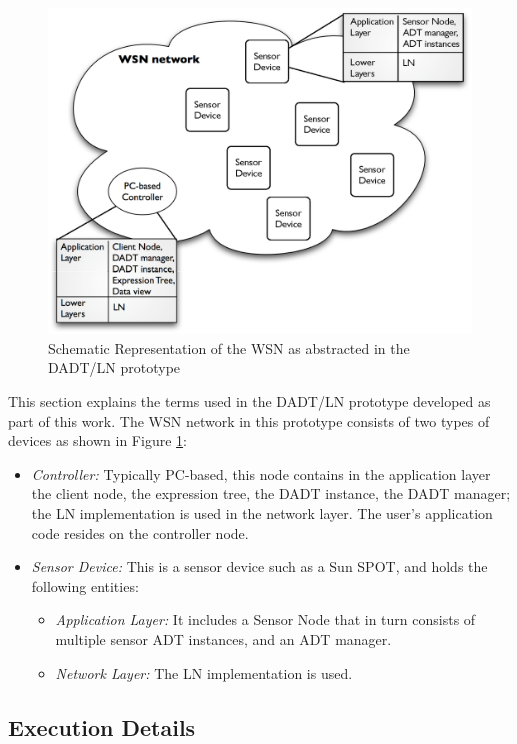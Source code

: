 \begin{figure}
\centering
\label{Fig:DADTLN_glossary}
\includegraphics[scale=0.55]{img/DADTLN_glossary.eps} 
\caption[WSN in DADT/LN prototype]{Schematic Representation of the WSN as abstracted in the DADT/LN prototype}

\end{figure} 

This section explains the terms used in the DADT/LN prototype developed as part
of this work. The WSN network in this prototype consists of two types of
devices as shown in Figure \ref{Fig:DADTLN_glossary}: 
\begin{itemize}
  \item \emph{Controller:} Typically PC-based, this node contains in the
  application layer the client node, the expression tree, the DADT instance, the
  DADT manager; the LN
  implementation is used in the network layer. The user's application code resides on
  the controller node.
  \item \emph{Sensor Device:} This is a sensor device such as a Sun SPOT, and
  holds the following entities:
  \begin{itemize}
    \item \emph{Application Layer:} It includes a Sensor Node that in turn
    consists of multiple sensor ADT instances, and an ADT manager.
    \item \emph{Network Layer:} The LN implementation is used.
  \end{itemize}
\end{itemize}

\subsection{Execution Details}

